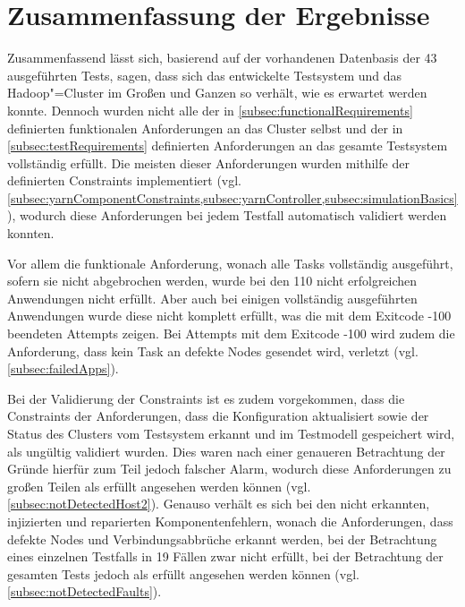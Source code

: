 \section{Zusammenfassung der Ergebnisse}
\label{sec:evaluationResults}

Zusammenfassend lässt sich, basierend auf der vorhandenen Datenbasis der 43 ausgeführten Tests, sagen, dass sich das entwickelte Testsystem und das Hadoop"=Cluster im Großen und Ganzen so verhält, wie es erwartet werden konnte.
Dennoch wurden nicht alle der in \cref{subsec:functionalRequirements} definierten funktionalen Anforderungen an das Cluster selbst und der in \cref{subsec:testRequirements} definierten Anforderungen an das gesamte Testsystem vollständig erfüllt.
Die meisten dieser Anforderungen wurden mithilfe der definierten Constraints implementiert (vgl. \cref{subsec:yarnComponentConstraints,subsec:yarnController,subsec:simulationBasics}), wodurch diese Anforderungen bei jedem Testfall automatisch validiert werden konnten.

Vor allem die funktionale Anforderung, wonach alle Tasks vollständig ausgeführt, sofern sie nicht abgebrochen werden, wurde bei den 110 nicht erfolgreichen Anwendungen nicht erfüllt.
Aber auch bei einigen vollständig ausgeführten Anwendungen wurde diese nicht komplett erfüllt, was die mit dem Exitcode -100 beendeten Attempts zeigen.
Bei Attempts mit dem Exitcode -100 wird zudem die Anforderung, dass kein Task an defekte Nodes gesendet wird, verletzt (vgl. \cref{subsec:failedApps}).

Bei der Validierung der Constraints ist es zudem vorgekommen, dass die Constraints der Anforderungen, dass die Konfiguration aktualisiert sowie der Status des Clusters vom Testsystem erkannt und im Testmodell gespeichert wird, als ungültig validiert wurden.
Dies waren nach einer genaueren Betrachtung der Gründe hierfür zum Teil jedoch falscher Alarm, wodurch diese Anforderungen zu großen Teilen als erfüllt angesehen werden können (vgl. \cref{subsec:notDetectedHost2}).
Genauso verhält es sich bei den nicht erkannten, injizierten und reparierten Komponentenfehlern, wonach die Anforderungen, dass defekte Nodes und Verbindungsabbrüche erkannt werden, bei der Betrachtung eines einzelnen Testfalls in 19 Fällen zwar nicht erfüllt, bei der Betrachtung der gesamten Tests jedoch als erfüllt angesehen werden können (vgl. \cref{subsec:notDetectedFaults}).

